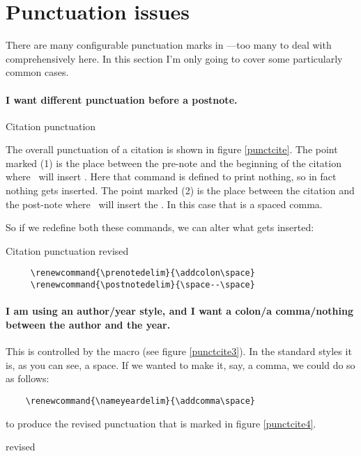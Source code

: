 \section{Punctuation issues}

There are many configurable punctuation marks in \biblatex---too many to deal with comprehensively here. In this section I'm only going to cover some particularly common cases.

\paragraph{I want different punctuation before a postnote.}
\begin{marginfigure}[12ex]
\vspace{3pt}%
\caption{Citation punctuation}\label{punctcite}
\end{marginfigure}
 The overall punctuation of a citation is shown in figure \ref{punctcite}. The point marked (1) is the place between the pre-note and the beginning of the citation where \biblatex\ will insert . Here that command is defined to print nothing, so in fact nothing gets inserted. The point marked (2) is the place between the citation and the post-note where \biblatex\ will insert the . In this case that is a spaced comma.

 So if we redefine both these commands, we can alter what gets inserted:\begin{marginfigure}[12ex]
\vspace{3pt}%
\caption{Citation punctuation revised}\label{punctcite2}
\end{marginfigure}
 \begin{Verbatim}
     \renewcommand{\prenotedelim}{\addcolon\space}
     \renewcommand{\postnotedelim}{\space--\space}
 \end{Verbatim}

 \paragraph{I am using an author/year style, and I want a colon/a comma/nothing between the author and the year.} 
\begin{marginfigure}[4ex]
\vspace{3pt}%
\caption{}\label{punctcite3}
\end{marginfigure}
This is controlled by the  macro (see figure \ref{punctcite3}). In the standard styles it is, as you can see, a space. If we wanted to make it, say, a comma, we could do so as follows:
\begin{Verbatim}
    \renewcommand{\nameyeardelim}{\addcomma\space}
\end{Verbatim}
to produce the revised punctuation that is marked in figure \ref{punctcite4}.
\begin{marginfigure}[4ex]
\vspace{3pt}%
\caption{ revised}\label{punctcite4}
\end{marginfigure}

